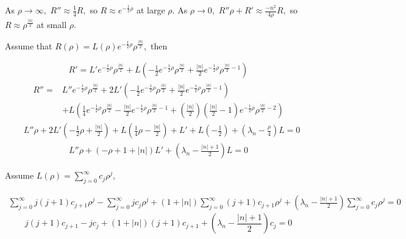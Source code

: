 \begin{enumerate}
        As $\rho\to\infty,$ $R''\approx\frac{1}{4}R,$ so 
        $R\approx e^{-\frac{1}{2}\rho}$ at large $\rho.$
        As $\rho\to0,$ $R''\rho+R'\approx\frac{-n^2}{4\rho}R,$ so 
        $R\approx \rho^{\frac{|n|}{2}}$ at small $\rho.$
        
        Assume that $R(\rho)=L(\rho)e^{-\frac{1}{2}\rho}\rho^{\frac{|n|}{2}},$ then
        
        \begin{align*}
            R' = L'
            e^{-\frac{1}{2}\rho}\rho^{\frac{|n|}{2}}
            +L(-\frac{1}{2}e^{-\frac{1}{2}\rho}\rho^{\frac{|n|}{2}}+
            \frac{|n|}{2}e^{-\frac{1}{2}\rho}\rho^{\frac{|n|}{2}-1})
        \end{align*}
        \begin{align*}
            R'' =& L''e^{-\frac{1}{2}\rho}\rho^{\frac{|n|}{2}}+
            2L'(-\frac{1}{2}e^{-\frac{1}{2}\rho}\rho^{\frac{|n|}{2}}+
            \frac{|n|}{2}e^{-\frac{1}{2}\rho}\rho^{\frac{|n|}{2}-1})\\
            &+
            L
            (\frac{1}{4}e^{-\frac{1}{2}\rho}\rho^{\frac{|n|}{2}}
            -\frac{|n|}{2}e^{-\frac{1}{2}\rho}\rho^{\frac{|n|}{2}-1}+
            (\frac{|n|}{2})(\frac{|n|}{2}-1)e^{-\frac{1}{2}\rho}\rho^{\frac{|n|}{2}-2})
        \end{align*}
        \begin{align*}
            &L''\rho + 2L'(-\frac{1}{2}\rho+\frac{|n|}{2})
            +L(\frac{1}{4}\rho-\frac{|n|}{2}) +L' + L(-\frac{1}{2} )+
            (\lambda_n-\frac{\rho}{4})L = 0
        \end{align*}
        \begin{align*}
            L''\rho + (-\rho+1+|n|)L' + (\lambda_n-\frac{|n|+1}{2})L = 0
        \end{align*}

        
        Assume $L(\rho)=\sum_{j=0}^\infty c_j\rho^j,$

        \begin{align*}
            \sum_{j=0}^\infty 
            j(j+1)c_{j+1}\rho^j
            -\sum_{j=0}^\infty 
            jc_j\rho^j+
            (1+|n|)
            \sum_{j=0}^\infty 
            (j+1)c_{j+1}\rho^j
            +(\lambda_n-\frac{|n|+1}{2})
            \sum_{j=0}^\infty 
            c_j\rho^j
            =0
        \end{align*}
        $$
        j(j+1)c_{j+1}
        -jc_j
        +(1+|n|)(j+1)c_{j+1}
        +(\lambda_n-\frac{|n|+1}{2})c_j
        =0
        $$


\end{enumerate}
